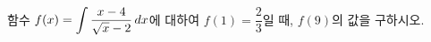 함수 $f(x)=\displaystyle\int \dfrac{x-4}{\sqrt{x}-2}\mkern3mu dx$에 대하여 $f(1)=\dfrac{2}{3}$일 때, $f(9)$의 값을 구하시오.
